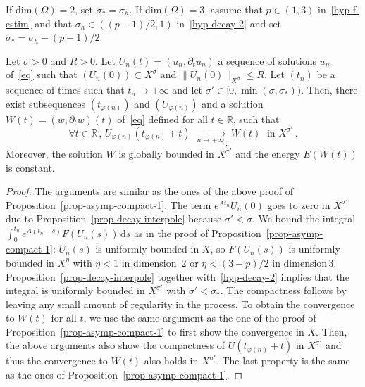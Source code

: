 \documentclass[AHL,Unicode,longabstracts]{cedram}
\newcommand{\RR}{\mathbb{R}}
\newcommand{\drm}{\mathrm{d}}
\let\oldforall\forall
\renewcommand*{\forall}{\mathrel{\oldforall}}
\begin{document}
\goodbreak

\begin{prop}\label{prop-asymp-compact-2}
If dim$(\Omega)=2$, set $\sigma_*=\sigma_h$. If dim$(\Omega)=3$, assume that $p\in(1,3)$ in~\eqref{hyp-f-estim} and that $\sigma_h\in ((p-1)/2,1)$ in~\eqref{hyp-decay-2} and set $\sigma_*=\sigma_h - (p-1)/2$.

Let $\sigma>0$ and $R>0$. Let $U_n(t)=(u_n,\partial_t u_n)$ a sequence of solutions $u_n$ of~\eqref{eq} such that $(U_n(0))\subset X^\sigma$ and $\|U_n(0)\|_{X^\sigma}\leq R$. Let $(t_n)$ be a sequence of times such that $t_n\rightarrow +\infty$ and let $\sigma'\in [0,\min(\sigma,\sigma_*))$. Then, there exist subsequences $(t_{\varphi(n)})$ and $(U_{\varphi(n)})$ and a solution $W(t)=(w,\partial_t w)(t)$ of~\eqref{eq} defined for all $t\in\RR$, such that
\[
\forall
t\in\RR\,,\,U_{\varphi(n)}(t_{\varphi(n)}+t)\,\xrightarrow[\;n\longrightarrow
+\infty\:]{}_,W(t)\;\text{ in } X^{\sigma'}\,.
\]
Moreover, the solution $W$ is globally bounded in $X^{\sigma'}$ and the energy $E(W(t))$ is constant.
\end{prop}
\begin{proof}
The arguments are similar as the ones of the above proof of Proposition~\ref{prop-asymp-compact-1}. The term $e^{At_n}U_n(0)$ goes to zero in $X^{\sigma'}$ due to Proposition~\ref{prop-decay-interpole} because $\sigma'<\sigma$. We bound the integral $\int_0^{t_n} e^{A(t_n-s)}F(U_n(s))\,\drm s$ as in the proof of Proposition~\ref{prop-asymp-compact-1}: $U_n(s)$ is uniformly bounded in $X$, so $F(U_n(s))$ is uniformly bounded in $X^\eta$ with $\eta<1$ in dimension~$2$ or $\eta<(3-p)/2$ in dimension\,$3$. Proposition~\ref{prop-decay-interpole} together with~\eqref{hyp-decay-2} implies that the integral is uniformly bounded in $X^{\sigma'}$ with $\sigma'<\sigma_*$. The compactness follows by leaving any small amount of regularity in the process. To obtain the convergence to $W(t)$ for all $t$, we use the same argument as the one of the proof of Proposition~\ref{prop-asymp-compact-1} to first show the convergence in $X$. Then, the above arguments also show the compactness of $U(t_{\varphi(n)}+t)$ in $X^{\sigma'}$ and thus the convergence to $W(t)$ also holds in $X^{\sigma'}$. The last property is the same as the ones of Proposition~\ref{prop-asymp-compact-1}.
\end{proof}
\end{document}
